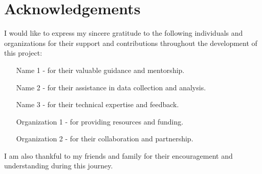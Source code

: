 \section*{Acknowledgements}
I would like to express my sincere gratitude to the following individuals and organizations for their support and contributions throughout the development of this project:

\begin{itemize}
    \item [Name 1] - for their valuable guidance and mentorship.
    \item [Name 2] - for their assistance in data collection and analysis.
    \item [Name 3] - for their technical expertise and feedback.
    \item [Organization 1] - for providing resources and funding.
    \item [Organization 2] - for their collaboration and partnership.
\end{itemize}

I am also thankful to my friends and family for their encouragement and understanding during this journey.
